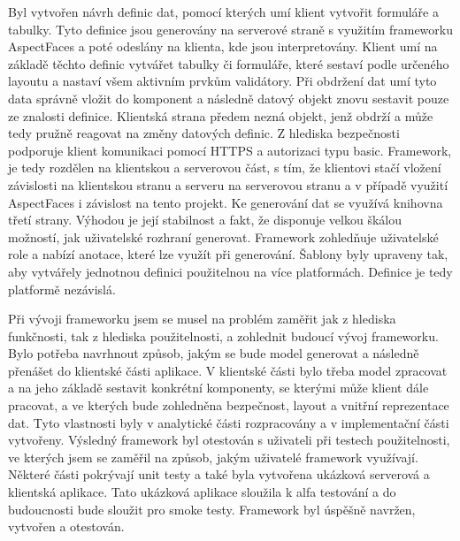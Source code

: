 Byl vytvořen návrh definic dat, pomocí kterých umí klient vytvořit formuláře a tabulky. Tyto definice jsou generovány na serverové straně s využitím frameworku AspectFaces a poté odeslány na klienta, kde jsou interpretovány. Klient umí na základě těchto definic vytvářet tabulky či formuláře, které sestaví podle určeného layoutu a nastaví všem aktivním prvkům validátory. Při obdržení dat umí tyto data správně vložit do komponent a následně datový objekt znovu sestavit pouze ze znalosti definice. Klientská strana předem nezná objekt, jenž obdrží a může tedy pružně reagovat na změny datových definic. Z hlediska bezpečnosti podporuje klient komunikaci pomocí HTTPS a autorizaci typu basic. Framework, je tedy rozdělen na klientskou a serverovou část, s tím, že klientovi stačí vložení závislosti na klientskou stranu a serveru na serverovou stranu a v případě využití AspectFaces i závislost na tento projekt. Ke generování dat se využívá knihovna třetí strany. Výhodou je její stabilnost a fakt, že disponuje velkou škálou možností, jak uživatelské rozhraní generovat. Framework zohledňuje uživatelské role a nabízí anotace, které lze využít při generování. Šablony byly upraveny tak, aby vytvářely jednotnou definici použitelnou na více platformách. Definice je tedy platformě nezávislá. 

Při vývoji frameworku jsem se musel na problém zaměřit jak z hlediska funkčnosti, tak z hlediska použitelnosti, a zohlednit budoucí vývoj frameworku. Bylo potřeba navrhnout způsob, jakým se bude model generovat a následně přenášet do klientské části aplikace. V klientské části bylo třeba model zpracovat a na jeho základě sestavit konkrétní komponenty, se kterými může klient dále pracovat, a ve kterých bude zohledněna bezpečnost, layout a vnitřní reprezentace dat. Tyto vlastnosti byly v analytické části rozpracovány a v implementační části vytvořeny. Výsledný framework byl otestován s uživateli při testech použitelnosti, ve kterých jsem se zaměřil na způsob, jakým uživatelé framework využívají. Některé části pokrývají unit testy a také byla vytvořena ukázková serverová a klientská aplikace. Tato ukázková aplikace sloužila k alfa testování a do budoucnosti bude sloužit pro smoke testy. Framework byl úspěšně navržen, vytvořen a otestován.